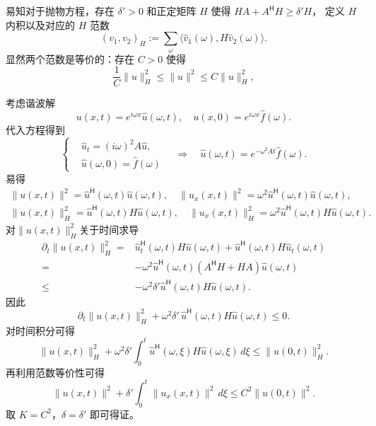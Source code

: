 \begin{solution*}
    易知对于抛物方程，存在 $\delta' >0$ 和正定矩阵 $H$ 使得 $H A + A^\mathsf{H} H \ge \delta' H$，
    定义 $H$ 内积以及对应的 $H$ 范数
    \[
        (v_1,v_2)_H := \sum_\omega \langle\hat{v}_1(\omega),H \hat{v}_2(\omega)\rangle.
    \]
    显然两个范数是等价的：存在 $C>0$ 使得
    \[
        \frac{1}{C} \| u \|_H^2  \le \| u \|^2 \le C \| u \|_H^2,
    \]

    考虑谐波解
    \[
        u(x,t) = e^{i \omega x} \hat{u}(\omega,t),\quad
        u(x,0) = e^{i \omega x} \hat{f}(\omega).
    \]
    代入方程得到
    \[
        \left\{
        \begin{aligned}
             & \hat{u}_t = (i \omega)^2 A \hat{u}, \\
             & \hat{u}(\omega,0) = \hat{f}(\omega)
        \end{aligned}
        \right.
        \quad \Rightarrow \quad
        \hat{u}(\omega,t) = e^{- \omega^2 A t}\hat{f}(\omega).
    \]
    易得
    \begin{gather*}
        \| u(x,t) \|^2 = \hat{u}^\mathsf{H}(\omega,t) \hat{u}(\omega,t),\quad
        \| u_x(x,t) \|^2 = \omega^2 \hat{u}^\mathsf{H}(\omega,t) \hat{u}(\omega,t), \\
        \| u(x,t) \|_H^2 = \hat{u}^\mathsf{H}(\omega,t) H \hat{u}(\omega,t),\quad
        \| u_x(x,t) \|_H^2 = \omega^2 \hat{u}^\mathsf{H}(\omega,t) H \hat{u}(\omega,t).
    \end{gather*}
    对$\| u(x,t) \|_H^2$关于时间求导
    \begin{align*}
        \partial_t \| u(x,t) \|_H^2
        ={}   & \hat{u}_t^\mathsf{H}(\omega,t) H \hat{u}(\omega,t) + \hat{u}^\mathsf{H}(\omega,t) H \hat{u}_t(\omega,t) \\
        ={}   & - \omega^2 \hat{u}^\mathsf{H}(\omega,t) (A^\mathsf{H} H + H A) \hat{u}(\omega,t)                        \\
        \le{} & - \omega^2 \delta' \hat{u}^\mathsf{H}(\omega,t) H \hat{u}(\omega,t).
    \end{align*}
    因此
    \[
        \partial_t \| u(x,t) \|_H^2 + \omega^2 \delta'\, \hat{u}^\mathsf{H}(\omega,t) H \hat{u}(\omega,t) \le 0.
    \]
    对时间积分可得
    \[
        \| u(x,t) \|_H^2  +\omega^2  \delta' \int_0^t \hat{u}^\mathsf{H}(\omega,\xi) H \hat{u}(\omega,\xi) \,d\xi \le \| u(0,t) \|_H^2.
    \]
    再利用范数等价性可得
    \[
        \| u(x,t) \|^2  + \delta' \int_0^t \| u_x(x,t) \|^2 \,d\xi \le C^2 \| u(0,t) \|^2.
    \]
    取 $K=C^2$，$\delta = \delta'$ 即可得证。
\end{solution*}

